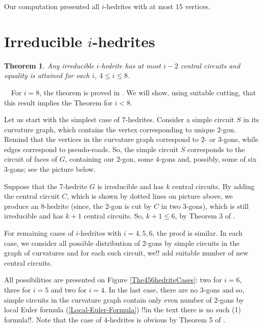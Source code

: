 \documentclass[12pt]{article}
\newtheorem{theorem}{Theorem}
\newcommand{\proof}{\noindent{\bf Proof.}\ \ }
\begin{document}
Our computation presented all $i$-hedrites with at most $15$ 
vertices. 


\section{Irreducible $i$-hedrites}



\begin{theorem}\label{irre}
Any irreducible $i$-hedrite has at most $i-2$ central circuits and equality is attained for each $i$, $4\leq i\leq 8$.
\end{theorem}
\proof For $i=8$, the theorem is proved in \cite{DSt}. We will show, using suitable cutting, that this result implies the Theorem for $i<8$.

Let us start with the simplest case of $7$-hedrites. Consider a simple circuit $S$ in its curvature graph, which contains the vertex corresponding to unique $2$-gon. Remind that the vertices in the curvature graph correspond to $2$- or $3$-gons, while edges correspond to pseudo-roads. So, the simple circuit $S$ corresponds to the circuit of faces of $G$, containing our $2$-gon, some $4$-gons and, possibly, some of six $3$-gons; see the picture below.


\begin{center}
\epsfxsize=40mm
\end{center}






Suppose that the $7$-hedrite $G$ is irreducible and has $k$ central circuits. By adding the central circuit $C$, which is shown by dotted lines on picture above, we produce an $8$-hedrite (since, the $2$-gon is cut by $C$ in two $3$-gons), which is still irreducible and has $k+1$ central circuits. So, $k+1\leq 6$, by Theorem 3 of \cite{DSt}.


For remaining cases of $i$-hedrites with $i=4,5,6$, the proof is similar. In each case, we consider all possible distribution of $2$-gons by simple circuits in the graph of curvatures and for each such circuit, we!! add suitable number of new central circuits. 


All possibilities are presented on Figure \ref{The456hedriteCases}:
two for $i=6$, three for $i=5$ and two for $i=4$. In the last case, there
are no $3$-gons and so, simple circuits in the curvature graph contain
only even number of $2$-gons by local Euler formula
(\ref{Local-Euler-Formula})
!!in the text there is no such (1) formula!!. Note that the case 
of $4$-hedrites is obvious by Theorem 5 of \cite{DSt}.
\end{document}
